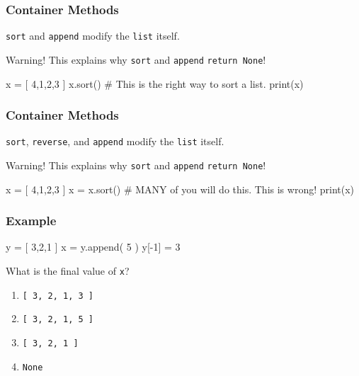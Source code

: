 \documentclass[11pt]{beamer}
\begin{document}
\begin{frame}[fragile]
  \frametitle{Container Methods}
  \Enlarge

  \begin{itemize}
  \myitem  \texttt{sort} and \texttt{append} modify the \texttt{list} itself. %
  \end{itemize}
  \begin{alertblock}{Warning!}
  This explains why \texttt{sort} and \texttt{append} \texttt{return None}!
  \end{alertblock}
  \begin{semiverbatim}
x = [ 4,1,2,3 ]
x.sort()        # This is the right way to sort a list.
print(x)
  \end{semiverbatim}
\end{frame}

\begin{frame}[fragile]
  \frametitle{Container Methods}
  \Enlarge

  \begin{itemize}
  \myitem  \texttt{sort}, \texttt{reverse}, and \texttt{append} modify the \texttt{list} itself.
  \end{itemize}
  \begin{alertblock}{Warning!}
  This explains why \texttt{sort} and \texttt{append} \texttt{return None}!
  \end{alertblock}
  \begin{semiverbatim}
x = [ 4,1,2,3 ]
x = x.sort()    # MANY of you will do this.  This is wrong!
print(x)
  \end{semiverbatim}
\end{frame}

\begin{frame}[fragile]
  \frametitle{Example}
  \Enlarge

  \begin{semiverbatim}
y = [ 3,2,1 ]
x = y.append( 5 )
y[-1] = 3
  \end{semiverbatim}
  What is the final value of \texttt{x}?
  \begin{enumerate}[label=\Alph*]
  \item  \texttt{[ 3, 2, 1, 3 ]}
  \item  \texttt{[ 3, 2, 1, 5 ]}
  \item  \texttt{[ 3, 2, 1 ]}
  \item  \texttt{None}
  \end{enumerate}
\end{frame}
\end{document}
